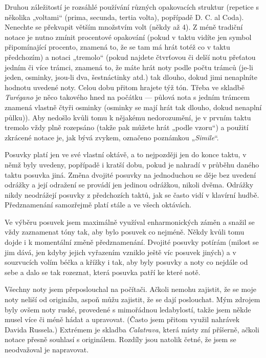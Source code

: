 \documentclass[11pt,a4paper]{article}
\begin{document}
Druhou záležitostí je rozsáhlé používání různých opakovacích struktur (repetice s několika „voltami“ (prima, secunda, tertia volta), popřípadě D. C. al Coda). Nenechte se překvapit větším množstvím volt (někdy až 4). Z méně tradiční notace je nutno zmínit procentové opakování (pokud v taktu vidíte jen symbol připomínající procento, znamená to, že se tam má hrát totéž co v taktu předchozím) a notaci „tremolo“ (pokud najdete čtvrťovou či delší notu přeťatou jedním či více trámci, znamená to, že máte hrát noty podle počtu trámců (je-li jeden, osminky, jsou-li dva, šestnáctinky atd.) tak dlouho, dokud jimi nenaplníte hodnotu uvedené noty. Celou dobu přitom hrajete týž tón. Třeba ve skladbě \emph{Turégano} je něco takového hned na počátku --- půlová nota s jedním trámcem znamená vlastně čtyři osminky (osminky se mají hrát tak dlouho, dokud nenaplní půlku)). Aby nedošlo kvůli tomu k nějakému nedorozumění, je v prvním taktu tremolo vždy plně rozepsáno (takže pak můžete hrát „podle vzoru“) a použití zkrácené notace je, jak bývá zvykem, označeno poznámkou „\emph{Simile}“.

Posuvky platí jen ve své vlastní oktávě, a to nejpozději jen do konce taktu, v němž byly uvedeny, popřípadě i kratší dobu, pokud je nahradí v průběhu daného taktu posuvka jiná. Změna dvojité posuvky na jednoduchou se děje bez uvedení odrážky a její odražení se provádí jen jedinou odrážkou, nikoli dvěma. Odrážky nikdy neodrážejí posuvky z předchozích taktů, jak se často vidí v klavírní hudbě. Předznamenání samozřejmě platí stále a ve všech oktávách.

Ve výběru posuvek jsem maximálně využíval enharmonických záměn a snažil se vždy zaznamenat tóny tak, aby bylo posuvek co nejméně. Někdy kvůli tomu dojde i k momentální změně předznamenání. Dvojité posuvky potírám (milost se jim dává, jen kdyby jejich vyřazením vzniklo ještě víc posuvek jiných) a v souzvucích volím béčka a křížky i tak, aby byly posuvky a noty co nejdále od sebe a dalo se tak rozeznat, která posuvka patří ke které notě.

Všechny noty jsem přeposlouchal na počítači. Ačkoli nemohu zajistit, že se moje noty neliší od originálu, aspoň můžu zajistit, že se dají poslouchat. Mým zdrojem byly ovšem noty ruské, provedené s mimořádnou ledabylostí, takže jsem někde musel více či méně hádat a upravovat. (Často jsem přitom využil nahrávek Davida Russela.) Extrémem je skladba \emph{Calatrava}, která místy zní příšerně, ačkoli notace přesně souhlasí s originálem. Rozdíly jsou natolik četné, že jsem se neodvažoval je napravovat.
\end{document}
